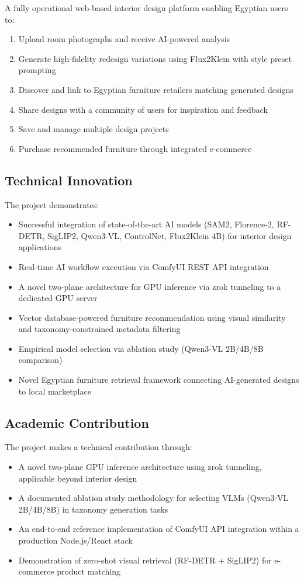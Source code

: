 A fully operational web-based interior design platform enabling Egyptian users to:
\begin{enumerate}
    \item Upload room photographs and receive AI-powered analysis
    \item Generate high-fidelity redesign variations using Flux2Klein with style preset prompting
    \item Discover and link to Egyptian furniture retailers matching generated designs
    \item Share designs with a community of users for inspiration and feedback
    \item Save and manage multiple design projects
    \item Purchase recommended furniture through integrated e-commerce
\end{enumerate}

\subsection{Technical Innovation}

The project demonstrates:
\begin{itemize}
    \item Successful integration of state-of-the-art AI models (SAM2, Florence-2, RF-DETR, SigLIP2, Qwen3-VL, ControlNet, Flux2Klein 4B) for interior design applications
    \item Real-time AI workflow execution via ComfyUI REST API integration
    \item A novel two-plane architecture for GPU inference via zrok tunneling to a dedicated GPU server
    \item Vector database-powered furniture recommendation using visual similarity and taxonomy-constrained metadata filtering
    \item Empirical model selection via ablation study (Qwen3-VL 2B/4B/8B comparison)
    \item Novel Egyptian furniture retrieval framework connecting AI-generated designs to local marketplace
\end{itemize}

\subsection{Academic Contribution}

The project makes a technical contribution through:
\begin{itemize}
    \item A novel two-plane GPU inference architecture using zrok tunneling, applicable beyond interior design
    \item A documented ablation study methodology for selecting VLMs (Qwen3-VL 2B/4B/8B) in taxonomy generation tasks
    \item An end-to-end reference implementation of ComfyUI API integration within a production Node.js/React stack
    \item Demonstration of zero-shot visual retrieval (RF-DETR + SigLIP2) for e-commerce product matching
\end{itemize}

